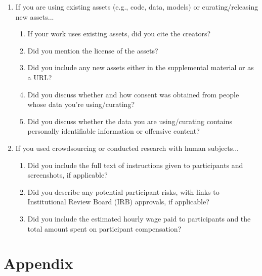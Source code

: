 \documentclass{article}
\begin{document}
\begin{enumerate}
\item If you are using existing assets (e.g., code, data, models) or curating/releasing new assets...
\begin{enumerate}
  \item If your work uses existing assets, did you cite the creators?
  \item Did you mention the license of the assets?
  \item Did you include any new assets either in the supplemental material or as a URL?
    \answerNA{}
  \item Did you discuss whether and how consent was obtained from people whose data you're using/curating?
  \item Did you discuss whether the data you are using/curating contains personally identifiable information or offensive content?
    \answerNA{}
\end{enumerate}


\item If you used crowdsourcing or conducted research with human subjects...
\begin{enumerate}
  \item Did you include the full text of instructions given to participants and screenshots, if applicable?
    \answerNA{}
  \item Did you describe any potential participant risks, with links to Institutional Review Board (IRB) approvals, if applicable?
    \answerNA{}
  \item Did you include the estimated hourly wage paid to participants and the total amount spent on participant compensation?
    \answerNA{}
\end{enumerate}


\end{enumerate}



\newpage
\appendix
{} %
\part{Appendix} %
\parttoc %
\end{document}
